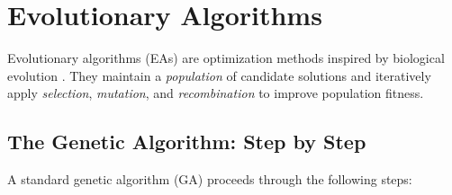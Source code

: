 \section{Evolutionary Algorithms}
\label{sec:evolutionary-algorithms}

Evolutionary algorithms (EAs) are optimization methods inspired by biological evolution \citep{holland1975, dejong2006}. They maintain a \emph{population} of candidate solutions and iteratively apply \emph{selection}, \emph{mutation}, and \emph{recombination} to improve population fitness.

\subsection{The Genetic Algorithm: Step by Step}

A standard genetic algorithm (GA) proceeds through the following steps:

